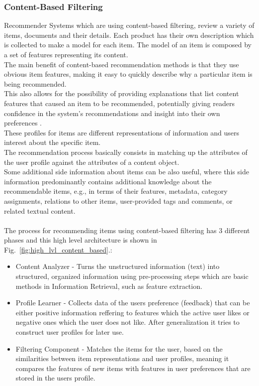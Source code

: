 \documentclass[\myFontSize,oneside,english,hidelinks,a4paper]{article}
\begin{document}
\subsubsection{Content-Based Filtering}
Recommender Systems which are using content-based filtering, review a variety of items, documents and their details. Each product has their own description which is collected to make a model for each item. The model of an item is composed by a set of features representing its content. \\
The main benefit of content-based recommendation methods is that they use obvious item features, making it easy to quickly describe why a particular item is being recommended. \cite{pub.1034486657}\\
This also allows for the possibility of providing explanations that list content features that caused an item to be recommended, potentially giving readers confidence in the system’s recommendations and insight into their own preferences \cite{Mooney2000195}. \\
These profiles for items are different representations of information and users interest about the specific item. \\
The recommendation process basically consists in matching up the attributes of the user profile against the attributes of a content object. \cite{pub.1034486657}\\
%
%
Some additional side information about items can be also useful, where this side information predominantly contains additional knowledge about the recommendable items, e.g., in terms of their features, metadata, category assignments, relations to other items, user-provided tags and comments, or related textual content. \cite{Lops2019239}\\\\
The process for recommending items using content-based filtering has 3 different phases and this high level architecture is shown in Fig.~\ref{fig:high_lvl_content_based}.:
\begin{itemize}
\item Content Analyzer - Turns the unstructured information (text) into structured, organized information using pre-processing steps which are basic methods in Information Retrieval, such as feature extraction.
\item Profile Learner - Collects data of the users preference (feedback) that can be either positive information reffering to features which the active user likes or negative ones which the user does not like. After generalization it tries to construct user profiles for later use.
\item Filtering Component - Matches the items for the user, based on the similarities between item representations and user profiles, meaning it compares the features of new items with features in user preferences that are stored in the users profile. \cite{pub.1034486657}
\end{itemize}
%
\end{document}
